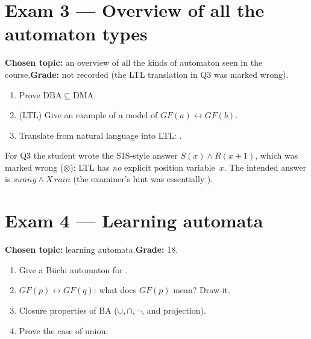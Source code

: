 \documentclass[oneside]{academica}
\begin{document}
\begin{center}

\qquad\qquad

\end{center}

\section{Exam 3 --- Overview of all the automaton types}
\textbf{Chosen topic:} an overview of all the kinds of automaton seen in
the course.\quad\textbf{Grade:} not recorded (the LTL translation in Q3
was marked wrong).

\begin{enumerate}
  \item Prove $\mathrm{DBA}\subseteq\mathrm{DMA}$.
  \item (LTL) Give an example of a model of $GF(a)\leftrightarrow
    GF(b)$.
  \item Translate from natural language into LTL: .
\end{enumerate}

\begin{note}
  For Q3 the student wrote the S1S-style answer $S(x)\wedge R(x{+}1)$,
  which was marked wrong ($\otimes$): LTL has \emph{no} explicit position
  variable~$x$. The intended answer is $\mathit{sunny}\wedge
  X\,\mathit{rain}$ (the examiner's hint was essentially ).
\end{note}

\section{Exam 4 --- Learning automata}
\textbf{Chosen topic:} learning automata.\quad\textbf{Grade:} $18$.

\begin{enumerate}
  \item Give a Büchi automaton for .
  \item $GF(p)\leftrightarrow GF(q)$: what does $GF(p)$ mean? Draw it.
  \item Closure properties of BA ($\cup,\cap,\neg$, and projection).
  \item Prove the case of union.
\end{enumerate}
\end{document}
